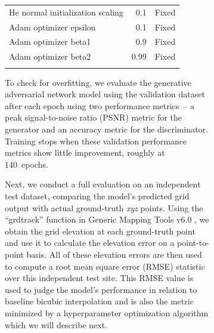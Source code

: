 \documentclass[tc, noline]{copernicus}
\begin{document}
\begin{figure}[t]
\begin{figure}[t]
\begin{table}[h!]
\begin{tabular}{lrr}
  He normal initialization scaling                     & 0.1                 & Fixed                                  \\
  Adam optimizer epsilon                               & 0.1                 & Fixed                                  \\
  Adam optimizer beta1                                 & 0.9                 & Fixed                                  \\
  Adam optimizer beta2                                 & 0.99                & Fixed                                  \\
  \bottomhline
  \end{tabular}
  \belowtable{} %
\end{table}

To check for overfitting, we evaluate the generative adversarial network model using the validation dataset after each epoch using two performance metrics~-- a peak signal-to-noise ratio (PSNR) metric for the generator and an accuracy metric for the discriminator.
Training stops when these validation performance metrics show little improvement, roughly at 140~epochs.

Next, we conduct a full evaluation on an independent test dataset, comparing the model's predicted grid output with actual ground-truth \textit{xyz} points.
Using the ``grdtrack'' function in Generic Mapping Tools v6.0 \citep{WesselGenericMappingTools2019}, we obtain the grid elevation at each ground-truth point and use it to calculate the elevation error on a point-to-point basis.
All of these elevation errors are then used to compute a root mean square error (RMSE) statistic over this independent test site.
This RMSE value is used to judge the model's performance in relation to baseline bicubic interpolation and is also the metric minimized by a hyperparameter optimization algorithm which we will describe next.


\end{figure}
\end{figure}
\end{document}
